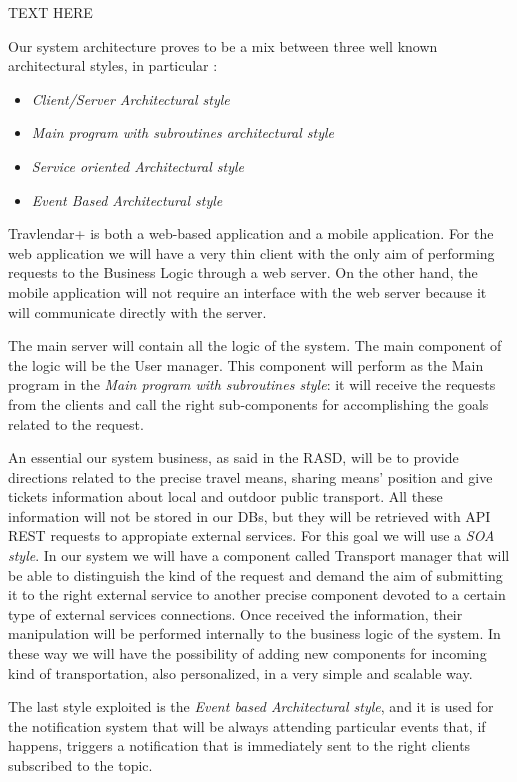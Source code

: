 
TEXT HERE

Our system architecture proves to be a mix between three well known architectural styles, in particular : 

\begin{itemize}
\setlength{\leftskip}{0.5cm}
\item \emph{Client/Server Architectural style}
\item \emph{Main program with subroutines architectural style}
\item \emph{Service oriented Architectural style}
\item \emph{Event Based Architectural style}
\end{itemize}

Travlendar+ is both a web-based application and a mobile application. For the web application we will have a very thin client with the only aim of performing requests to the Business Logic through a web server.
On the other hand, the mobile application will not require an interface with the web server because it will communicate directly with the server.
\\\par
The main server will contain all the logic of the system. The main component of the logic will be the User manager. This component will perform as the Main program in the \emph{Main program with subroutines style}: it will receive the requests from the clients and call the right sub-components for accomplishing the goals related to the request.
\\\par
An essential our system business, as said in the RASD, will be to provide directions related to the precise travel means, sharing means’ position and give tickets information about local and outdoor public transport. All these information will not be stored in our DBs, but they will be retrieved with API REST requests to appropiate external services. For this goal we will use a \emph{SOA style}. 
In our system we will have a component called Transport manager that will be able to distinguish the kind of the request and demand the aim of submitting it to the right external service to another precise component devoted to a certain type of external services connections. Once received the information, their manipulation will be performed internally to the business logic of the system. In these way we will have the possibility of adding new components for incoming kind of transportation, also personalized, in a very simple and scalable way.
\\\par
The last style exploited is the \emph{Event based Architectural style}, and it is used for the notification system that will be always attending particular events that, if happens, triggers a notification that is immediately sent to the right clients subscribed to the topic. 

